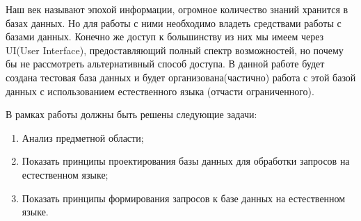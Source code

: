 \Introduction

Наш век называют эпохой информации, огромное количество знаний хранится в базах данных. Но для работы с ними необходимо владеть средствами работы с базами данных. Конечно же доступ к большинству из них мы имеем через UI(User Interface), предоставляющий полный спектр возможностей, но почему бы не рассмотреть альтернативный способ доступа. В данной работе будет создана тестовая база данных и будет организована(частично) работа с этой базой данных с использованием естественного языка (отчасти ограниченного).

В рамках работы должны быть решены следующие задачи:
\begin{enumerate}
  \item Анализ предметной области;
  \item Показать принципы проектирования базы данных для обработки запросов на естественном языке;
  \item Показать принципы формирования запросов к базе данных на естественном языке.
\end{enumerate}
